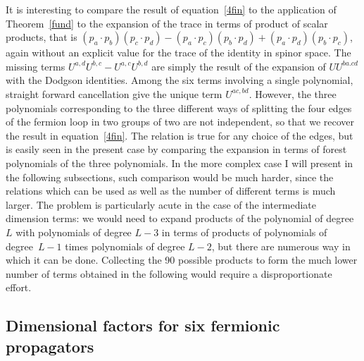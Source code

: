 \documentclass[pdftex]{sigma}
\numberwithin{equation}{section}
\begin{document}
It is interesting to compare the result of equation~\eqref{4fin} to the application of Theorem~\ref{fund} to the expansion of the trace in terms of product of
scalar products, that is $ (p_a\cdot p_b) (p_c \cdot p_d) - (p_a \cdot p_c)(p_b \cdot p_d)+ (p_a \cdot p_d)(p_b \cdot p_c)$, again without an explicit
value for the trace of the identity in spinor space. The missing terms $U^{a,d} U^{b,c} - U^{a,c} U^{b,d}$ are simply the result of the expansion
of $U U^{ba.cd}$ with the Dodgson identities. Among the six terms involving a single polynomial, straight forward cancellation give the unique
term $U^{ac,bd}$. However, the three polynomials corresponding to the three different ways of splitting the four edges of the fermion loop in two
groups of two are not independent, so that we recover the result in equation~\eqref{4fin}. The relation is true for any choice of the edges, but is
easily seen in the present case by comparing the expansion in terms of forest polynomials of the three polynomials. In the more complex case I will
present in the following subsections, such comparison would be much harder, since the relations which can be used as well as the number of different
terms is much larger. The problem is particularly acute in the case of the intermediate dimension terms: we would need to expand products of the
polynomial of degree $L$ with polynomials of degree $L-3$ in terms of products of polynomials of degree~${L-1}$ times polynomials of degree
$L-2$, but there are numerous way in which it can be done. Collecting the 90 possible products to form the much lower number of terms obtained in
the following would require a disproportionate effort.

\subsection{Dimensional factors for six fermionic propagators} \label{sixdirac}
\end{document}
